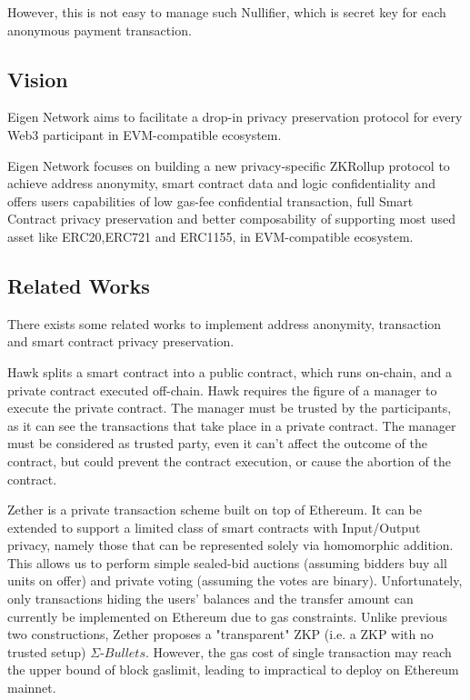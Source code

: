 \documentclass{article}
\begin{document}
However, this is not easy to manage such Nullifier, which is secret key for each anonymous payment transaction. 

\subsection{Vision}

Eigen Network aims to facilitate a drop-in privacy preservation protocol for every Web3 participant in EVM-compatible ecosystem.

Eigen Network focuses on building a new privacy-specific ZKRollup protocol to achieve address anonymity, smart contract data and logic confidentiality and offers users capabilities of low gas-fee confidential transaction, full Smart Contract privacy preservation and better composability of supporting most used asset like ERC20,ERC721 and ERC1155, in EVM-compatible ecosystem.

\subsection{Related Works}

There exists some related works to implement address anonymity, transaction and smart contract privacy preservation. 

Hawk\cite{kosba2016hawk} splits a smart contract into a public contract, which runs on-chain, and a private contract executed off-chain. Hawk requires the figure of a manager to execute the private contract. The manager must be trusted by the participants, as it can see the transactions that take place in a private contract. The manager must be considered as trusted party, even it can't affect the outcome of the contract, but could prevent the contract execution, or cause the abortion of the contract.

Zether\cite{bunz2020zether} is a private transaction scheme built on top of Ethereum. It can be extended to support a limited class of smart contracts with Input/Output privacy, namely those that can be represented solely via homomorphic addition. This allows us to perform simple sealed-bid auctions (assuming bidders buy all units on offer) and private voting (assuming the votes are binary). Unfortunately, only transactions hiding the users' balances and the transfer amount can currently be implemented on Ethereum due to gas constraints. Unlike previous two constructions, Zether proposes a "transparent" ZKP (i.e. a ZKP with no trusted setup) $\Sigma\mbox{-}Bullets$. 
However, the gas cost of single transaction may reach the upper bound of block gaslimit, leading to impractical to deploy on Ethereum mainnet.
\end{document}
